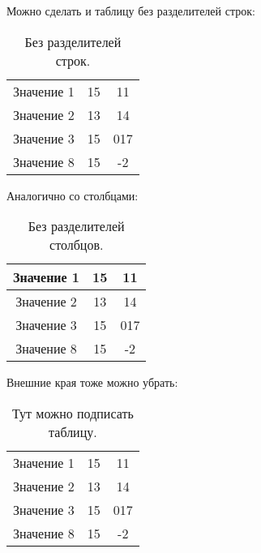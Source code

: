 \documentclass[a4paper, 12pt]{article}
\begin{document}
Можно сделать и таблицу без разделителей строк:
\begin{table}[h!]
    \centering
    \caption{Без разделителей строк.}
	\begin{tabular}{ |c|c|c|}
 \hline
 Значение 1 & 15 & 11 \\
 Значение 2 & 13 & 14\\ 
 Значение 3 & 15 & 017 \\ 
 Значение 8 & 15 & -2 \\ \hline
	\end{tabular}
\end{table}

\newpage
Аналогично со столбцами:
\begin{table}[h!]
    \centering
    \caption{Без разделителей столбцов.}
	\begin{tabular}{ |ccc|}
 \hline
 Значение 1 & 15 & 11 \\ \hline
 Значение 2 & 13 & 14\\ \hline
 Значение 3 & 15 & 017 \\ \hline
 Значение 8 & 15 & -2 \\ \hline
	\end{tabular}
\end{table}


Внешние края тоже можно убрать:
\begin{table}[h!]
    \centering
    \caption{Тут можно подписать таблицу.}
	\begin{tabular}{ ccc}
 Значение 1 & 15 & 11 \\ 
 Значение 2 & 13 & 14\\ 
 Значение 3 & 15 & 017 \\ 
 Значение 8 & 15 & -2 \\
	\end{tabular}
\end{table}
\end{document}
